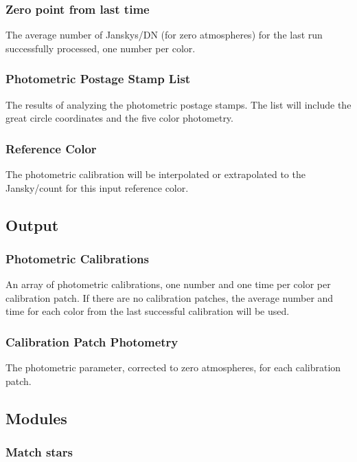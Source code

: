 \subsubsection{Zero point from last time}

The average number of Janskys/DN (for zero atmospheres) for the last run 
successfully processed, one number per color.

\subsubsection{Photometric Postage Stamp List}

The results of analyzing the photometric postage stamps.  The list will include
the great circle coordinates and the five color photometry.

\subsubsection{Reference Color}

The photometric calibration will be interpolated or extrapolated to the
Jansky/count for this input reference color.

\subsection{Output}

\subsubsection{Photometric Calibrations}
An array of photometric calibrations, one number and one time
per color per calibration patch.  If there are no calibration patches, 
the average number and time for each color
from the last successful calibration will be used.

\subsubsection{Calibration Patch Photometry}
The photometric parameter, corrected to zero atmospheres, for each
calibration patch.

\subsection{Modules}

\subsubsection{Match stars}

